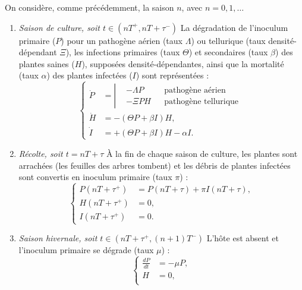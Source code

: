 	On considère, comme précédemment, la saison $n$, avec $n=0,1,\ldots$
\begin{enumerate}
\item \emph{Saison de culture, soit $t\in(nT^+,nT+\tau^-)$}\quad
La dégradation de l'inoculum primaire ($P$) pour un pathogène aérien (taux $\Lambda$) ou tellurique (taux densité-dépendant $\Xi$), les infections primaires (taux $\Theta$) et secondaires (taux $\beta$) des plantes saines ($H$), supposées densité-dépendantes, ainsi que  la mortalité (taux $\alpha$) des  plantes infectées ($I$) sont représentées : 
	\begin{equation}
	  \left\{
	    \begin{aligned}
	      \dot{P} &=
	      \left|
	      \begin{aligned}
	        &- \Lambda P &&\text{pathogène aérien} \\
	        &- \Xi P H &&\text{pathogène tellurique}
	      \end{aligned}
	      \right.\\
	      \dot{H} &= - (\Theta P  + \beta I) H,\\
	      \dot{I} &= + (\Theta P  + \beta I) H - \alpha I.
	    \end{aligned}
	  \right.
	  \label{eq:mailleret-saison}
	\end{equation}
	\item  \emph{Récolte, soit $t=nT+\tau$}\quad
	  À la fin de chaque saison de culture, les plantes sont arrachées (les feuilles des arbres tombent) et les débris de plantes infectées sont convertis en inoculum primaire (taux $\pi$) :
	  \begin{equation}
	    \left\{
	      \begin{aligned}
	        P(nT+ \tau^{+}) &= P(nT + \tau) + \pi I(nT + \tau),\\
	        H(nT+ \tau^{+}) &=0,   \\
	        I(nT+ \tau^{+}) &=0.
	      \end{aligned}
	    \right.
	    \label{eq:mailleret-recolte}
	  \end{equation} 
	\item  \emph{Saison hivernale, soit $t\in(nT+\tau^+,(n+1)T^-)$}\quad
	  L'hôte est absent et l'inoculum primaire se dégrade (taux $\mu$) :
	  \begin{equation}
	    \left\{
	      \begin{aligned}
	        \frac{dP}{dt} & = -\mu P, \\
	        H &= 0, \\

\end{aligned}
\end{equation}
\end{enumerate}
